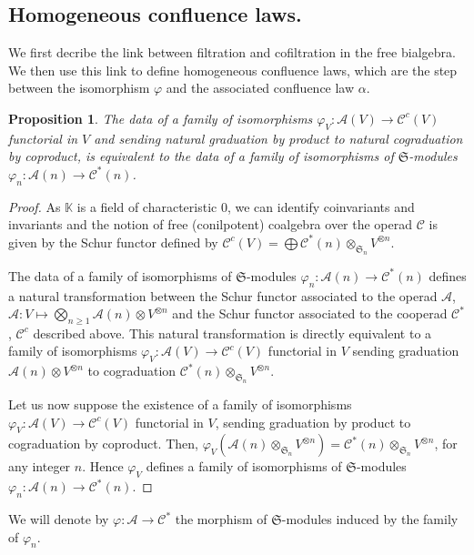 \documentclass[11pt,leqno]{amsart}
\theoremstyle{definition}
\theoremstyle{plain}
\newtheorem{proposition}[definition]{Proposition}
\newcommand{\A}{ \mathcal{A} }
\newcommand{\C}{ \mathcal{C} }
\newcommand{\K}{ \mathbb{K} }
\begin{document}
\subsection{Homogeneous confluence laws.} \label{hom}

We first decribe the link between filtration and cofiltration in the free bialgebra. We then use this link to define homogeneous confluence laws, which are the step between the isomorphism $\varphi$ and the associated confluence law $\alpha$.


\begin{proposition}
The data of a family of isomorphisms $\varphi_V: \A(V) \rightarrow \C^c(V)$ functorial in $V$ and sending natural graduation by product to natural cograduation by coproduct, is equivalent to the data of a family of isomorphisms of $\mathfrak{S}$-modules $\varphi_n: \A(n) \rightarrow \C^*(n)$. 
\end{proposition}

\begin{proof}
 As $\K$ is a field of characteristic $0$, we can identify coinvariants and invariants and the notion of free (conilpotent) coalgebra over the operad $\C$ is given by the Schur functor defined by $\C^c(V)=\bigoplus \C^*(n) \otimes_{\mathfrak{S}_n} V^{\otimes n} $. 

The data of a family of isomorphisms of $\mathfrak{S}$-modules $\varphi_n: \A(n) \rightarrow \C^*(n)$ defines a natural transformation between the Schur functor associated to the operad $\mathcal{A}$, $\A: V \mapsto \bigotimes_{n \geq 1} \mathcal{A}(n) \otimes V^{\otimes n}$ and the Schur functor associated to the cooperad $\mathcal{C}^*$, $\C^c$  described above. This natural transformation is directly equivalent to a family of isomorphisms $\varphi_V: \A(V) \rightarrow \C^c(V)$ functorial in $V$ sending graduation $\mathcal{A}(n) \otimes V^{\otimes n}$ to cograduation $\C^*(n) \otimes_{\mathfrak{S}_n} V^{\otimes n} $. 

Let us now suppose the existence of a family of isomorphisms $\varphi_V: \A(V) \rightarrow \C^c(V)$ functorial in $V$, sending graduation by product to cograduation by coproduct. Then, $\varphi_V(\A(n) \otimes_{\mathfrak{S}_n} V^{\otimes n}) = \C^ *(n) \otimes_{\mathfrak{S}_n} V^{\otimes n}$, for any integer $n$. Hence $\varphi_V$ defines a family of isomorphisms of $\mathfrak{S}$-modules $\varphi_n: \A(n) \rightarrow \C^*(n)$. 
\end{proof}

We will denote by $\varphi: \A \rightarrow \C^*$ the morphism of $\mathfrak{S}$-modules induced by the family of $\varphi_n$.
\end{document}
